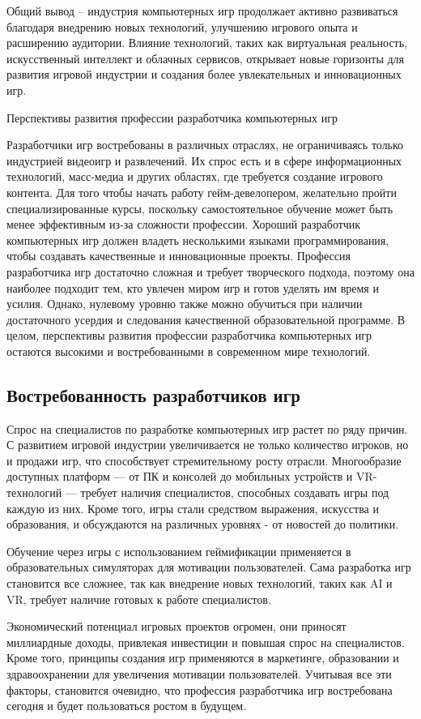 Общий вывод – индустрия компьютерных игр продолжает активно развиваться благодаря внедрению новых технологий, улучшению игрового опыта и расширению аудитории. Влияние технологий, таких как виртуальная реальность, искусственный интеллект и облачных сервисов, открывает новые горизонты для развития игровой индустрии и создания более увлекательных и инновационных игр.

Перспективы развития профессии разработчика компьютерных игр

Разработчики игр востребованы в различных отраслях, не ограничиваясь только индустрией видеоигр и развлечений. Их спрос есть и в сфере информационных технологий, масс-медиа и других областях, где требуется создание игрового контента. Для того чтобы начать работу гейм-девелопером, желательно пройти специализированные курсы, поскольку самостоятельное обучение может быть менее эффективным из-за сложности профессии. Хороший разработчик компьютерных игр должен владеть несколькими языками программирования, чтобы создавать качественные и инновационные проекты. Профессия разработчика игр достаточно сложная и требует творческого подхода, поэтому она наиболее подходит тем, кто увлечен миром игр и готов уделять им время и усилия. Однако, нулевому уровню также можно обучиться при наличии достаточного усердия и следования качественной образовательной программе. В целом, перспективы развития профессии разработчика компьютерных игр остаются высокими и востребованными в современном мире технологий.

\subsection{Востребованность разработчиков игр}

Спрос на специалистов по разработке компьютерных игр растет по ряду причин. С развитием игровой индустрии увеличивается не только количество игроков, но и продажи игр, что способствует стремительному росту отрасли. Многообразие доступных платформ — от ПК и консолей до мобильных устройств и VR-технологий — требует наличия специалистов, способных создавать игры под каждую из них. Кроме того, игры стали средством выражения, искусства и образования, и обсуждаются на различных уровнях - от новостей до политики.

Обучение через игры с использованием геймификации применяется в образовательных симуляторах для мотивации пользователей. Сама разработка игр становится все сложнее, так как внедрение новых технологий, таких как AI и VR, требует наличие готовых к работе специалистов. 

Экономический потенциал игровых проектов огромен, они приносят миллиардные доходы, привлекая инвестиции и повышая спрос на специалистов. Кроме того, принципы создания игр применяются в маркетинге, образовании и здравоохранении для увеличения мотивации пользователей. Учитывая все эти факторы, становится очевидно, что профессия разработчика игр востребована сегодня и будет пользоваться ростом в будущем.